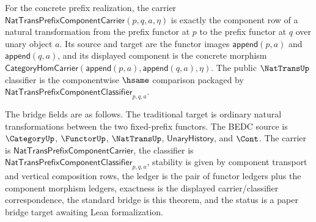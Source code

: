 \begin{theorem}
\label{thm:nattrans-prefix-standard-bridge}
For the concrete prefix realization, the carrier
$\mathsf{NatTransPrefixComponentCarrier}(p,q,a,\eta)$ is exactly the component
row of a natural transformation from the prefix functor at $p$ to the prefix
functor at $q$ over unary object $a$. Its source and target are the functor
images $\mathsf{append}(p,a)$ and $\mathsf{append}(q,a)$, and its displayed
component is the concrete morphism
$\mathsf{CategoryHomCarrier}(\mathsf{append}(p,a),\mathsf{append}(q,a),\eta)$.
The public $\NatTransUp$ classifier is the componentwise $\hsame$ comparison
packaged by $\mathsf{NatTransPrefixComponentClassifier}_{p,q,a}$.

The bridge fields are as follows. The traditional target is ordinary natural
transformations between the two fixed-prefix functors. The BEDC source is
$\CategoryUp$, $\FunctorUp$, $\NatTransUp$, $\mathsf{UnaryHistory}$, and
$\Cont$. The carrier is $\mathsf{NatTransPrefixComponentCarrier}$, the
classifier is $\mathsf{NatTransPrefixComponentClassifier}_{p,q,a}$, stability
is given by component transport and vertical composition rows, the ledger is
the pair of functor ledgers plus the component morphism ledgers, exactness is
the displayed carrier/classifier correspondence, the standard bridge is this
theorem, and the status is a paper bridge target awaiting Lean formalization.
\end{theorem}
